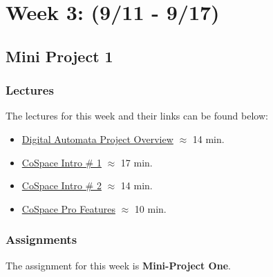 \clearpage
\chapter{Week 3: (9/11 - 9/17)}

\section{Mini Project 1}

\subsection{Lectures}

The lectures for this week and their links can be found below:

\begin{itemize}
    \item \href{https://applied.cs.colorado.edu/mod/hvp/view.php?id=49340}{Digital Automata Project Overview} $\approx$ 14 min.
    \item \href{https://applied.cs.colorado.edu/mod/hvp/view.php?id=49341}{CoSpace Intro \# 1} $\approx$ 17 min.
    \item \href{https://applied.cs.colorado.edu/mod/hvp/view.php?id=49342}{CoSpace Intro \# 2} $\approx$ 14 min.
    \item \href{https://applied.cs.colorado.edu/mod/hvp/view.php?id=49343}{CoSpace Pro Features} $\approx$ 10 min.
\end{itemize}

\subsection{Assignments}

The assignment for this week is \textbf{Mini-Project One}.  